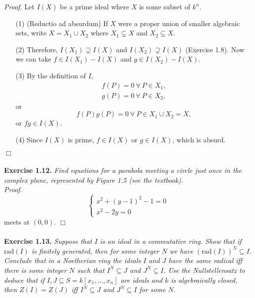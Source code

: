\documentclass{article}
\begin{document}
\emph{Proof.}
Let $I(X)$ be a prime ideal where $X$ is some subset of $k^n$.
\begin{enumerate}
  \item[(1)]
  (Reductio ad absurdum)
  If $X$ were a proper union of smaller algebraic sets, write $X = X_1 \cup X_2$
  where $X_1 \subsetneq X$ and $X_2 \subsetneq X$.
  \item[(2)]
  Therefore, $I(X_1) \supsetneq I(X)$ and $I(X_2) \supsetneq I(X)$ (Exercise 1.8).
  Now we can take $f \in I(X_1)-I(X)$ and $g \in I(X_2)-I(X)$.
  \item[(3)]
  By the definition of $I$,
  \begin{align*}
    f(P) = 0 \: \forall \: P \in X_1, \\
    g(P) = 0 \: \forall \: P \in X_2,
  \end{align*}
  or
  \[
    f(P) g(P) = 0 \: \forall \: P \in X_1 \cup X_2 = X,
  \]
  or $fg \in I(X)$.
  \item[(4)]
  Since $I(X)$ is prime, $f \in I(X)$ or $g \in I(X)$,
  which is absurd.
\end{enumerate}
$\Box$ \\\\






\textbf{Exercise 1.12.}
\emph{Find equations for a parabola meeting a circle just once
in the complex plane, represented by Figure 1.5 (see the textbook).} \\

\emph{Proof.}
\begin{equation*}
  \begin{cases}
    x^2 + (y-1)^2 - 1 = 0 \\
    x^2 - 2y = 0
  \end{cases}
\end{equation*}
meets at $(0,0)$.
$\Box$ \\\\






\textbf{Exercise 1.13.}
\emph{Suppose that $I$ is an ideal in a commutative ring.
Show that if $\mathrm{rad}(I)$ is finitely generated,
then for some integer $N$ we have $(\mathrm{rad}(I))^N \subseteq I$.
Conclude that in a Noetherian ring the ideals $I$ and $J$ have the same radical
iff there is some integer $N$ such that $I^N \subseteq J$ and $J^N \subseteq I$.
Use the Nullstellensatz to deduce that if $I, J \subseteq S = k[x_1,\ldots,x_n]$
are ideals and $k$ is algebraically closed,
then $Z(I) = Z(J)$ iff $I^N \subseteq J$ and $J^N \subseteq I$ for some $N$.} \\
\end{document}

